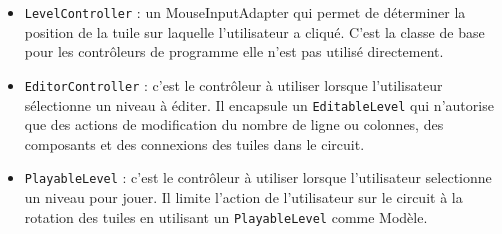 \documentclass{article}
\begin{document}
\begin{itemize}
\item {\tt LevelController} : un MouseInputAdapter qui permet de déterminer
  la position de la tuile sur laquelle l'utilisateur a cliqué. C'est la classe
  de base pour les contrôleurs de programme elle n'est pas utilisé directement.
\item {\tt EditorController} : c'est le contrôleur à utiliser lorsque
  l'utilisateur sélectionne un niveau à éditer. Il encapsule un
  {\tt EditableLevel} qui n'autorise que des actions de modification du nombre
  de ligne ou colonnes, des composants et des connexions des tuiles dans le
  circuit.
\item {\tt PlayableLevel} : c'est le contrôleur à utiliser lorsque l'utilisateur
  selectionne un niveau pour jouer. Il limite l'action de l'utilisateur sur le
  circuit à la rotation des tuiles en utilisant un {\tt PlayableLevel} comme
  Modèle.
\end{itemize}
\end{document}
